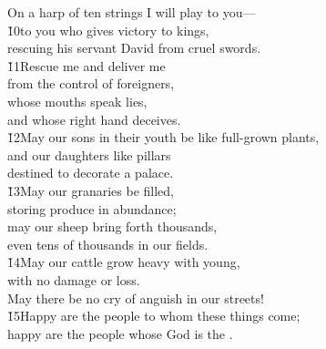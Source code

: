 \begin{poetry}
\poemll    On a harp of ten strings I will play to you--- \\
\poeml \v{10}to you who gives victory to kings, \\
\poemll    rescuing his servant David from cruel swords. \\
\poeml \v{11}Rescue me and deliver me \\
\poemll    from the control of foreigners, \\
\poeml whose mouths speak lies, \\
\poemll    and whose right hand deceives. \\
\poeml \v{12}May our sons in their youth be like full-grown plants, \\
\poemll    and our daughters like pillars \\
\poemlll       destined to decorate a palace. \\
\poeml \v{13}May our granaries be filled, \\
\poemll    storing produce in abundance; \\
\poeml may our sheep bring forth thousands, \\
\poemll    even tens of thousands in our fields. \\
\poeml \v{14}May our cattle grow heavy with young, \\
\poemll    with no damage or loss. \\
\poeml May there be no cry of anguish in our streets! \\
\poeml \v{15}Happy are the people to whom these things come; \\
\poemll    happy are the people whose God is the .
\end{poetry}

